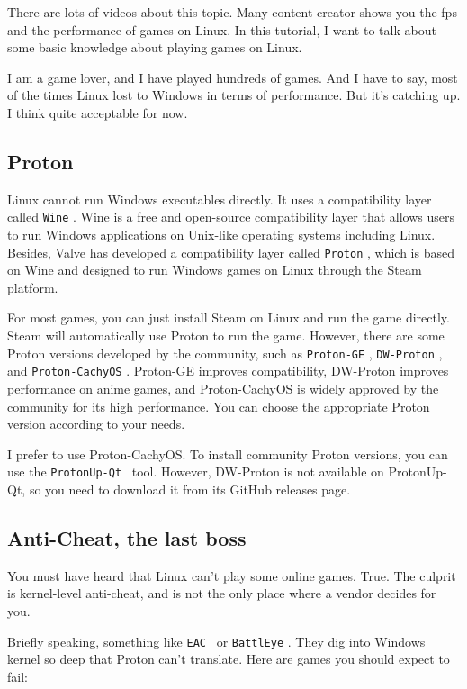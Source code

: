 \documentclass[lang=en,color=blue,12pt]{elegantbook}
\let\oldtexttt\texttt
\renewcommand{\texttt}[1]{%
  \begingroup
  \setlength{\fboxsep}{1pt}%
  \colorbox{gray!10}{\oldtexttt{#1}}%
  \endgroup
}
\begin{document}
There are lots of videos about this topic. Many content creator shows you the fps
and the performance of games on Linux. In this tutorial, I want to talk about
some basic knowledge about playing games on Linux.

I am a game lover, and I have played hundreds of games. And I have to say,
most of the times Linux lost to Windows in terms of performance. But it's catching
up. I think quite acceptable for now.

\subsection{Proton}

Linux cannot run Windows executables directly. It uses a compatibility layer
called \texttt{Wine}. Wine is a free and open-source compatibility layer that
allows users to run Windows applications on Unix-like operating systems including
Linux. Besides, Valve has developed a compatibility layer called \texttt{Proton},
which is based on Wine and designed to run Windows games on Linux through the
Steam platform.

For most games, you can just install Steam on Linux and run the game directly.
Steam will automatically use Proton to run the game. However, there are some
Proton versions developed by the community, such as \texttt{Proton-GE},
\texttt{DW-Proton}, and \texttt{Proton-CachyOS}. Proton-GE improves
compatibility, DW-Proton improves performance on anime games,
and Proton-CachyOS is widely approved by the community for its high performance.
You can choose the appropriate Proton version according to your needs.

I prefer to use Proton-CachyOS. To install community Proton versions, you can
use the \texttt{ProtonUp-Qt}\ tool. However, DW-Proton is not available on
ProtonUp-Qt, so you need to download it from its GitHub releases page.

\subsection{Anti-Cheat, the last boss}

You must have heard that Linux can't play some online games.
True. The culprit is kernel-level anti-cheat, and 
is not the only place where a vendor decides for you.

Briefly speaking, something like \texttt{EAC}\ or \texttt{BattlEye}. They
dig into Windows kernel so deep that Proton can't translate.
Here are games you should expect to fail:
\end{document}
